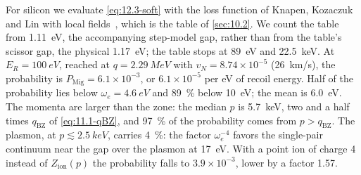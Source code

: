 For silicon we evaluate \cref{eq:12.3-soft} with the loss function of Knapen, Kozaczuk and Lin with local fields~\cite{knapen2021dark}, which is the table of \cref{sec:10.2}. We count the table from \SI{1.11}{eV}, the accompanying step-model gap, rather than from the table's scissor gap, the physical \SI{1.17}{eV}; the table stops at \SI{89}{eV} and \SI{22.5}{keV}. At $E_R = \SI{100}{eV}$, reached at $q = \SI{2.29}{MeV}$ with $v_N = 8.74\times10^{-5}$ (\SI{26}{km/s}), the probability is $P_{\mathrm{Mig}} = 6.1\times10^{-3}$, or $6.1\times10^{-5}$ per eV of recoil energy. Half of the probability lies below $\omega_e = \SI{4.6}{eV}$ and \SI{89}{\percent} below \SI{10}{eV}; the mean is \SI{6.0}{eV}. The momenta are larger than the zone: the median $p$ is \SI{5.7}{keV}, two and a half times $q_{\mathrm{BZ}}$ of \cref{eq:11.1-qBZ}, and \SI{97}{\percent} of the probability comes from $p > q_{\mathrm{BZ}}$. The plasmon, at $p \lesssim \SI{2.5}{keV}$, carries \SI{4}{\percent}: the factor $\omega_e^{-4}$ favors the single-pair continuum near the gap over the plasmon at \SI{17}{eV}. With a point ion of charge 4 instead of $Z_{\mathrm{ion}}(p)$ the probability falls to $3.9\times10^{-3}$, lower by a factor 1.57.

